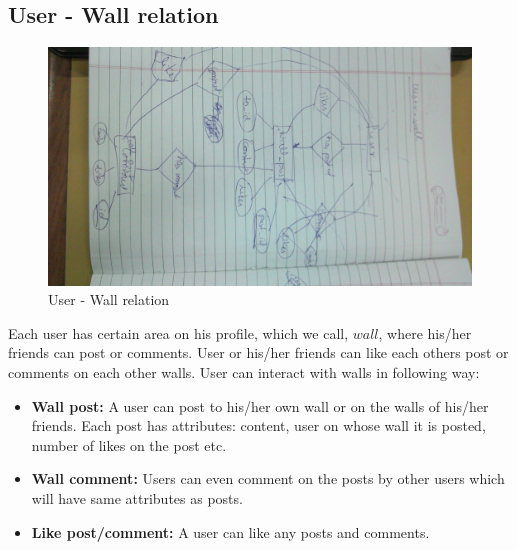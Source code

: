 \documentclass{article}
\begin{document}
\subsection{User - Wall relation}
\begin{figure}[h]
\centering
\includegraphics[scale=0.2]{fig5.jpg}
\caption{User - Wall relation}
\label{fig5}
\end{figure}
Each user has certain area on his profile, which we call, $wall$, where his/her friends can post or comments. User or his/her friends can like each others post or comments on each other walls. User can interact with walls in following way:
\begin{itemize}
\item \textbf{Wall post:} A user can post to his/her own wall or on the walls of his/her friends. Each post has attributes: content, user on whose wall it is posted, number of likes on the post etc.
\item \textbf{Wall comment:} Users can even comment on the posts by other users which will have same attributes as posts.
\item \textbf{Like post/comment:} A user can like any posts and comments. 
\end{itemize}
\end{document}

